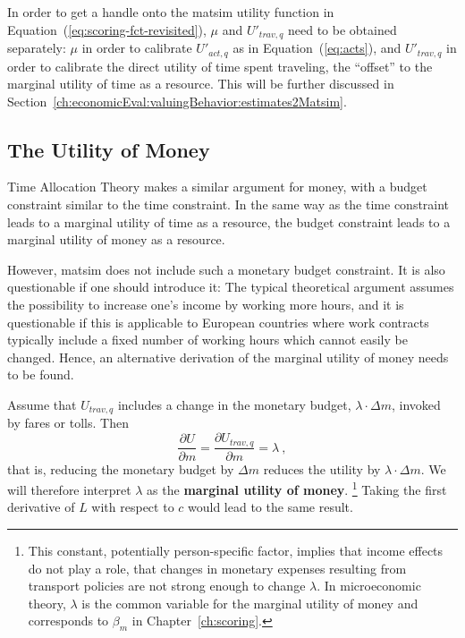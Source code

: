 In order to get a handle onto the \acrshort{matsim} utility function in Equation~(\ref{eq:scoring-fct-revisited}), $\mu$ and $U'_{trav,q}$ need to be obtained separately: $\mu$ in order to calibrate $U'_{act,q}$ as in Equation~(\ref{eq:acts}), and $U'_{trav,q}$ in order to calibrate the direct utility of time spent traveling, the ``offset'' to the marginal utility of time as a resource.
%
This will be further discussed in Section~\ref{ch:economicEval:valuingBehavior:estimates2Matsim}.

\subsection{The Utility of Money}
\label{ch:economicEval:valuingBehavior:uom}
Time Allocation Theory \citep{DeSerpa1997economicsOfTime, Jara-DiazGuevara-2003} makes a similar argument for money, with a budget constraint similar to the time constraint.
%
In the same way as the time constraint leads to a marginal utility of time as a resource, the budget constraint leads to a marginal utility of money as a resource.

However, \acrshort{matsim} does not include such a monetary budget constraint. It is also questionable if one should introduce it: The typical theoretical argument assumes the possibility to increase one's income by working more hours, and it is questionable if this is applicable to European countries where work contracts typically include a fixed number of working hours which cannot easily be changed.  
%
Hence, an alternative derivation of the marginal utility of money needs to be found.

Assume that $U_{trav,q}$ includes a change in the monetary budget, $\lambda \cdot \Delta m$, \eg invoked by fares or tolls.  Then
\[
%
\frac{\partial U}{\partial m} 
%
= \frac{\partial U_{trav,q}}{\partial m}
%
= \lambda \ ,
\]
that is, reducing the monetary budget by $\Delta m$ reduces the utility by $ \lambda \cdot \Delta m$.
%
We will therefore interpret $\lambda$ as the \textbf{marginal utility of money}.%
%
\footnote{\label{footnote:income-effects}
%
This constant, potentially person-specific factor, implies that income effects \citep{HerrigesKling1999Nonlinearincomeeffects,DalyEtAl2008WelfareMeasuresIncome, DagsvikKarlstrom2005ChoiceProbabilitiesInNonlinearRUM,Jara-Diaz1989IncomeEffectsInModeChoice} do not play a role, \ie that changes in monetary expenses resulting from transport policies are not strong enough to change $\lambda$. In microeconomic theory, $\lambda$ is the common variable for the marginal utility of money and corresponds to $\beta_{m}$ in Chapter~\ref{ch:scoring}.
%
}
%
Taking the first derivative of $L$ with respect to $c$ would lead to the same result.

